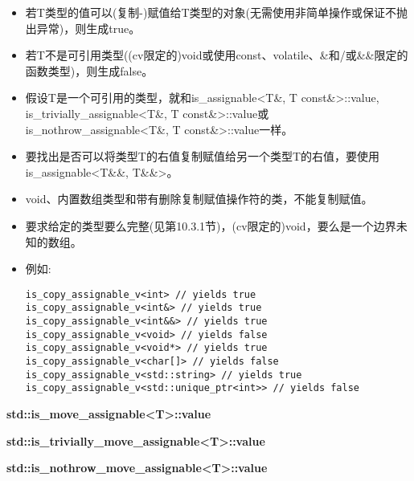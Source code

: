 \begin{itemize}
\item
若T类型的值可以(复制-)赋值给T类型的对象(无需使用非简单操作或保证不抛出异常)，则生成true。

\item
若T不是可引用类型((cv限定的)void或使用const、volatile、\&和/或\&\&限定的函数类型)，则生成false。
 
\item
假设T是一个可引用的类型，就和is\_assignable<T\&, T const\&>::value, is\_trivially\_assignable<T\&, T const\&>::value或is\_nothrow\_assignable<T\&, T const\&>::value一样。

\item
要找出是否可以将类型T的右值复制赋值给另一个类型T的右值，要使用is\_assignable<T\&\&, T\&\&>。

\item
void、内置数组类型和带有删除复制赋值操作符的类，不能复制赋值。

\item
要求给定的类型要么完整(见第10.3.1节)，(cv限定的)void，要么是一个边界未知的数组。

\item
例如:
\begin{lstlisting}[style=styleCXX]
is_copy_assignable_v<int> // yields true
is_copy_assignable_v<int&> // yields true
is_copy_assignable_v<int&&> // yields true
is_copy_assignable_v<void> // yields false
is_copy_assignable_v<void*> // yields true
is_copy_assignable_v<char[]> // yields false
is_copy_assignable_v<std::string> // yields true
is_copy_assignable_v<std::unique_ptr<int>> // yields false
\end{lstlisting}
\end{itemize}

\textbf{std::is\_move\_assignable<T>::value}

\textbf{std::is\_trivially\_move\_assignable<T>::value}

\textbf{std::is\_nothrow\_move\_assignable<T>::value}


